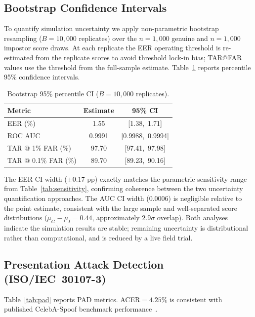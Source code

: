 \documentclass[conference]{IEEEtran}
\begin{document}
\subsection{Bootstrap Confidence Intervals}
\label{sec:bootstrap}

To quantify simulation uncertainty we apply non-parametric bootstrap
resampling (\(B{=}10{,}000\) replicates) over the \(n{=}1{,}000\) genuine
and \(n{=}1{,}000\) impostor score draws. At each replicate the EER
operating threshold is re-estimated from the replicate scores to avoid
threshold lock-in bias; TAR@FAR values use the threshold from the
full-sample estimate. Table~\ref{tab:bootstrap_ci} reports
percentile 95\% confidence intervals.

\begin{table}[t]
\centering
\caption{Bootstrap 95\% percentile CI (\(B{=}10{,}000\) replicates).}
\label{tab:bootstrap_ci}
\begin{tabular}{lcc}
  \toprule
  Metric & Estimate & 95\% CI \\
  \midrule
  EER (\%)            & 1.55   & [1.38,\ 1.71] \\
  ROC AUC             & 0.9991 & [0.9988,\ 0.9994] \\
  TAR @ 1\% FAR (\%)  & 97.70  & [97.41,\ 97.98] \\
  TAR @ 0.1\% FAR (\%)& 89.70  & [89.23,\ 90.16] \\
  \bottomrule
\end{tabular}
\end{table}

The EER CI width (\(\pm 0.17\) pp) exactly matches the parametric
sensitivity range from Table~\ref{tab:sensitivity}, confirming
coherence between the two uncertainty quantification approaches.
The AUC CI width (0.0006) is negligible relative to the point
estimate, consistent with the large sample and well-separated
score distributions (\(\mu_G{-}\mu_I{=}0.44\), approximately
\(2.9\sigma\) overlap). Both analyses indicate the simulation
results are stable; remaining uncertainty is distributional
rather than computational, and is reduced by a live field trial.

\subsection{Presentation Attack Detection (ISO/IEC~30107-3)}

Table~\ref{tab:pad} reports PAD metrics. ACER\(=4.25\%\) is consistent
with published CelebA-Spoof benchmark performance~\cite{zhang2020minifasnet}.
\end{document}
